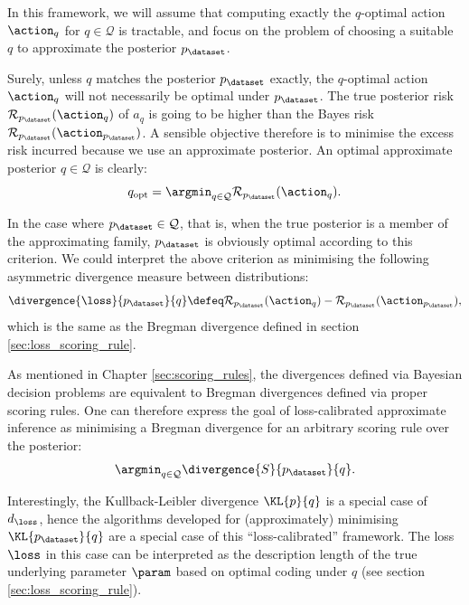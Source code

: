 In this framework, we will assume that computing exactly the $q$-optimal action $\action_q$ for $q \in \mathcal{Q}$ is tractable, and focus on the problem of choosing a suitable $q$ to approximate the posterior $p_\dataset$.

Surely, unless $q$ matches the posterior $p_\dataset$ exactly, the $q$-optimal action $\action_q$ will not necessarily be optimal under $p_\dataset$. The true posterior risk $\mathcal{R}_{p_\dataset}(\action_q)$ of $a_q$ is going to be higher than the Bayes risk $\mathcal{R}_{p_\dataset}(\action_{p_\dataset})$. A sensible objective therefore is to minimise the excess risk incurred because we use an approximate posterior. An optimal approximate posterior $q \in \mathcal{Q}$ is clearly:
%
\begin{equation}
	q_\mathrm{opt} = \argmin_{q \in \mathcal{Q}} \mathcal{R}_{p_\dataset}(\action_q).
\end{equation}

In the case where $p_\dataset\in\mathcal{Q}$, that is, when the true posterior is a member of the approximating family, $p_\dataset$ is obviously optimal according to this criterion. We could interpret the above criterion as minimising the following asymmetric divergence measure between distributions:
%
\begin{equation} \label{e:d_L}
	\divergence{\loss}{p_\dataset}{q} \defeq \mathcal{R}_{p_{\dataset}}(\action_q) - \mathcal{R}_{p_\dataset}(\action_{p_\dataset}),
\end{equation}
%
which is the same as the Bregman divergence defined in section \ref{sec:loss_scoring_rule}.

As mentioned in Chapter \ref{sec:scoring_rules}, the divergences defined via Bayesian decision problems are equivalent to Bregman divergences defined via proper scoring rules. One can therefore express the goal of loss-calibrated approximate inference as minimising a Bregman divergence for an arbitrary scoring rule over the posterior:
%
\begin{equation}
	\argmin_{q \in \mathcal{Q}} \divergence{S}{p_{\dataset}}{q}.
\end{equation}

Interestingly, the Kullback-Leibler divergence $\KL{p}{q}$ is a special case of $d_\loss$, hence the algorithms developed for (approximately) minimising  $\KL{p_\dataset}{q}$ are a special case of this ``loss-calibrated'' framework. The loss $\loss$ in this case can be interpreted as the description length of the true underlying parameter $\param$ based on optimal coding under $q$ (see section \ref{sec:loss_scoring_rule}).

